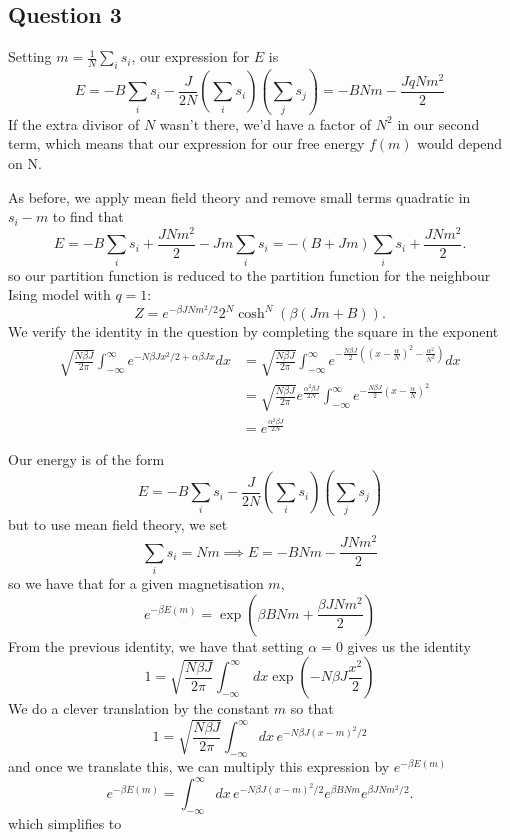 \subsection{Question 3}
Setting $m = \frac{1}{N} \sum_i s_i$, our expression for $E$ is 
\[ 
	E =  - B \sum_i s_i  - \frac{J}{2N} \left( \sum_i s_ i \right) \left( \sum_j s_j \right)  = - BNm - \frac{J q Nm^2}{2}
\]
If the extra divisor of $N$ wasn't there, we'd have a factor of $N^2$ in our second term, which means that our expression for our free energy $f(m)$ would depend on N. 

As before, we apply mean field theory and remove small terms quadratic in $s_i - m$ to find that 
\[ 
	E = - B \sum_i s_i +  \frac{JNm^2}{2} - J m \sum_i s_i  = - (B + Jm ) \sum_i s_i + \frac{JNm^2}{2}. 
\] 
so our partition function is reduced to the partition function for the neighbour Ising model with $q = 1$: 
\[
	Z =  e^{ - \beta J N m^2 / 2}2^N \cosh^N(\beta(J m + B)). 
\]
We verify the identity in the question by completing the square in the exponent 
\begin{align*}
	\sqrt{\frac{N \beta J }{2 \pi}} \int_{ -\infty}^{\infty} e^{ - N \beta J x^2 / 2 + \alpha \beta J x } dx&= \sqrt{\frac{N \beta J }{2 \pi}} \int_{- \infty}^{\infty} e^{ - \frac{N \beta J }{2} ((x - \frac{\alpha}{N})^2 - \frac{\alpha^2}{N^2})}dx \\ 
		&= \sqrt{\frac{N \beta J }{2 \pi}} e^{\frac{\alpha^2 \beta J }{2 N }} \int_{ - \infty}^{\infty} e^{ -\frac{N \beta J }{2} (x - \frac{\alpha}{N})^2} \\
		&= e^{\frac{\alpha^2 \beta J }{2 N }}
\end{align*}



Our energy is of the form 
\[
	E = - B\sum_i s_i - \frac{J}{2N}\left( \sum_i s_i \right) \left( \sum_j s_j \right)  
\]
but to use mean field theory, we set 
\[
	\sum_i s_i = Nm \implies E = - BNm - \frac{JNm^2}{2} 
\]
so we have that for a given magnetisation $m$, 
\[
	e^{ - \beta E(m) } = \exp(\beta B Nm + \frac{\beta JNm^2}{2}) 
\]
From the previous identity, we have that setting $\alpha = 0$ gives us the identity 
\[
	1 = \sqrt{\frac{N \beta J}{2 \pi}} \int_{ - \infty}^{\infty} \, dx \exp( - N \beta J \frac{x^2}{2}) 
\]
We do a clever translation by the constant $m$ so that 
\[
	1 = \sqrt{\frac{N\beta J}{2 \pi}} \int_{-\infty}^\infty dx \, e^{ - N \beta J (x - m)^2 / 2}
\]
and once we translate this, we can multiply this expression by $e^{ - \beta E(m)}$
\[
	e^{ - \beta E(m)} = \int_{ - \infty}^\infty dx \, e^{ - N \beta J (x - m)^2  / 2}e^{\beta B N m}e^{\beta J N m^2 / 2}.
\]
which simplifies to 



